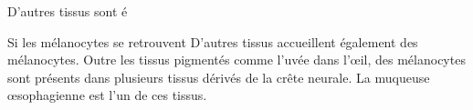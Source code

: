 





D'autres tissus sont é

Si les mélanocytes se retrouvent 
D'autres tissus accueillent également des mélanocytes. Outre les tissus pigmentés comme l'uvée dans l'œil, des mélanocytes sont présents dans plusieurs tissus dérivés de la crête neurale. La muqueuse œsophagienne est l'un de ces tissus.














